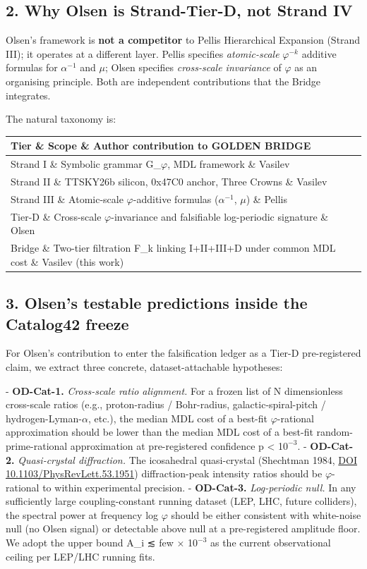 \subsection{2. Why Olsen is Strand-Tier-D, not Strand IV}

Olsen's framework is \textbf{not a competitor} to Pellis Hierarchical Expansion (Strand III); it operates at a different layer. Pellis specifies \textit{atomic-scale} $\varphi^{-k}$ additive formulas for $\alpha^{-1}$ and $\mu$; Olsen specifies \textit{cross-scale invariance} of $\varphi$ as an organising principle. Both are independent contributions that the Bridge integrates.

The natural taxonomy is:

\begin{tabular}{|l|l|l|}
\hline
Tier \& Scope \& Author contribution to GOLDEN BRIDGE \\
\hline
Strand I \& Symbolic grammar G\_$\varphi$, MDL framework \& Vasilev \\
Strand II \& TTSKY26b silicon, 0x47C0 anchor, Three Crowns \& Vasilev \\
Strand III \& Atomic-scale $\varphi$-additive formulas ($\alpha^{-1}$, $\mu$) \& Pellis \\
Tier-D \& Cross-scale $\varphi$-invariance and falsifiable log-periodic signature \& Olsen \\
Bridge \& Two-tier filtration F\_k linking I+II+III+D under common MDL cost \& Vasilev (this work) \\
\hline
\end{tabular}
\subsection{3. Olsen's testable predictions inside the Catalog42 freeze}

For Olsen's contribution to enter the falsification ledger as a Tier-D pre-registered claim, we extract three concrete, dataset-attachable hypotheses:

- \textbf{OD-Cat-1.} \textit{Cross-scale ratio alignment.} For a frozen list of N dimensionless cross-scale ratios (e.g., proton-radius / Bohr-radius, galactic-spiral-pitch / hydrogen-Lyman-$\alpha$, etc.), the median MDL cost of a best-fit $\varphi$-rational approximation should be lower than the median MDL cost of a best-fit random-prime-rational approximation at pre-registered confidence p < 1$0^{-3}$.
- \textbf{OD-Cat-2.} \textit{Quasi-crystal diffraction.} The icosahedral quasi-crystal (Shechtman 1984, \href{https://doi.org/10.1103/PhysRevLett.53.1951}{DOI 10.1103/PhysRevLett.53.1951}) diffraction-peak intensity ratios should be $\varphi$-rational to within experimental precision.
- \textbf{OD-Cat-3.} \textit{Log-periodic null.} In any sufficiently large coupling-constant running dataset (LEP, LHC, future colliders), the spectral power at frequency log $\varphi$ should be either consistent with white-noise null (no Olsen signal) or detectable above null at a pre-registered amplitude floor. We adopt the upper bound A\_i ≲ few $\times$ 1$0^{-3}$ as the current observational ceiling per LEP/LHC running fits.

